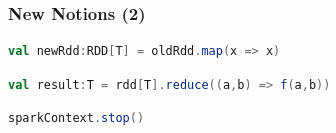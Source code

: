 \documentclass[slidetop,9pt,utf8]{beamer}
\begin{document}
\begin{frame}[fragile]
  \frametitle{New Notions (2)}

  \begin{lstlisting}[label=RDDTransformation, caption=Apply transformation to RDD, language=scala, style=code]
val newRdd:RDD[T] = oldRdd.map(x => x)
  \end{lstlisting}

  \begin{lstlisting}[label=RDDAction, caption=Apply action to RDD, language=scala, style=code]
val result:T = rdd[T].reduce((a,b) => f(a,b))
  \end{lstlisting}

  \begin{lstlisting}[label=StopSparkContext, caption=Stop Spark Context, language=scala, style=code]
sparkContext.stop()
  \end{lstlisting}

\end{frame}
\end{document}
